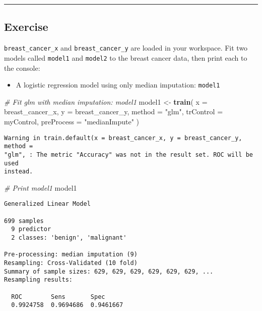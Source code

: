 \documentclass[
]{book}
\newenvironment{Shaded}{\begin{snugshade}}{\end{snugshade}}
\newcommand{\CommentTok}[1]{\textcolor[rgb]{0.56,0.35,0.01}{\textit{#1}}}
\newcommand{\DataTypeTok}[1]{\textcolor[rgb]{0.13,0.29,0.53}{#1}}
\newcommand{\KeywordTok}[1]{\textcolor[rgb]{0.13,0.29,0.53}{\textbf{#1}}}
\newcommand{\NormalTok}[1]{#1}
\newcommand{\StringTok}[1]{\textcolor[rgb]{0.31,0.60,0.02}{#1}}
\providecommand{\tightlist}{%
  \setlength{\itemsep}{0pt}\setlength{\parskip}{0pt}}
\begin{document}
\begin{center}\rule{0.5\linewidth}{0.5pt}\end{center}

\hypertarget{exercise-25}{%
\subsection*{Exercise}\label{exercise-25}}

\texttt{breast\_cancer\_x} and \texttt{breast\_cancer\_y} are loaded in your workspace. Fit two models called \texttt{model1} and \texttt{model2} to the breast cancer data, then print each to the console:

\begin{itemize}
\tightlist
\item
  A logistic regression model using only median imputation: \texttt{model1}
\end{itemize}

\begin{Shaded}
\begin{Highlighting}[]
\CommentTok{# Fit glm with median imputation: model1}
\NormalTok{model1 <-}\StringTok{ }\KeywordTok{train}\NormalTok{(}
  \DataTypeTok{x =}\NormalTok{ breast_cancer_x, }\DataTypeTok{y =}\NormalTok{ breast_cancer_y,}
  \DataTypeTok{method =} \StringTok{"glm"}\NormalTok{,}
  \DataTypeTok{trControl =}\NormalTok{ myControl,}
  \DataTypeTok{preProcess =} \StringTok{"medianImpute"}
\NormalTok{)}
\end{Highlighting}
\end{Shaded}

\begin{verbatim}
Warning in train.default(x = breast_cancer_x, y = breast_cancer_y, method =
"glm", : The metric "Accuracy" was not in the result set. ROC will be used
instead.
\end{verbatim}

\begin{Shaded}
\begin{Highlighting}[]
\CommentTok{# Print model1}
\NormalTok{model1}
\end{Highlighting}
\end{Shaded}

\begin{verbatim}
Generalized Linear Model 

699 samples
  9 predictor
  2 classes: 'benign', 'malignant' 

Pre-processing: median imputation (9) 
Resampling: Cross-Validated (10 fold) 
Summary of sample sizes: 629, 629, 629, 629, 629, 629, ... 
Resampling results:

  ROC        Sens       Spec     
  0.9924758  0.9694686  0.9461667
\end{verbatim}
\end{document}
